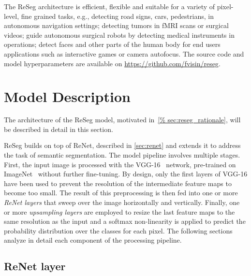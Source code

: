 The ReSeg architecture is efficient, flexible and suitable for a variety of
pixel-level, fine grained tasks, e.g., detecting road signs, cars, pedestrians,
in autonomous navigation settings; detecting tumors in fMRI scans or surgical
videos; guide autonomous surgical robots by detecting medical instruments in
operations; detect faces and other parts of the human body for end users
applications such as interactive games or camera autofocus.
The source code and model hyperparameters are available on
\href{https://github.com/fvisin/reseg}{https://github.com/fvisin/reseg}.


\section{Model Description}\label{sec:reseg_model}

The architecture of the ReSeg model, motivated in~\autoref{%
sec:reseg_rationale}, will be described in detail in this section.

ReSeg builds on top of ReNet, described in \autoref{sec:renet} and
extends it to address the task of semantic segmentation. The model pipeline
involves multiple stages. First, the input image is processed with the
VGG-16~\citep{Simonyan2015} network, pre-trained on
ImageNet~\citep{imagenet_cvpr09} without further fine-tuning. By design, only
the first layers of VGG-16 have been used to prevent the resolution of the
intermediate feature maps to become too small.  The result of this
preprocessing is then fed into one or more \emph{ReNet layers} that sweep over
the image horizontally and vertically. Finally, one or more \emph{upsampling
layers} are employed to resize the last feature maps to the same resolution as
the input and a softmax non-linearity is applied to predict the probability
distribution over the classes for each pixel. The following sections analyze in
detail each component of the processing pipeline.

\subsection{ReNet layer}

